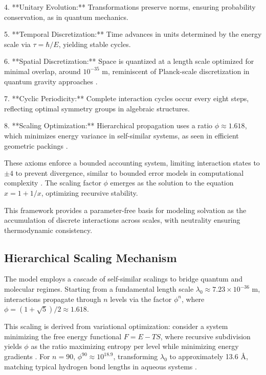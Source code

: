 \documentclass[twocolumn,prd,amsmath,amssymb,aps,superscriptaddress,nofootinbib]{revtex4-2}
\begin{document}
4. **Unitary Evolution:** Transformations preserve norms, ensuring probability conservation, as in quantum mechanics.

5. **Temporal Discretization:** Time advances in units determined by the energy scale via $\tau = \hbar / E$, yielding stable cycles.

6. **Spatial Discretization:** Space is quantized at a length scale optimized for minimal overlap, around $10^{-35}$ m, reminiscent of Planck-scale discretization in quantum gravity approaches \cite{Rovelli1998}.

7. **Cyclic Periodicity:** Complete interaction cycles occur every eight steps, reflecting optimal symmetry groups in algebraic structures.

8. **Scaling Optimization:** Hierarchical propagation uses a ratio $\phi \approx 1.618$, which minimizes energy variance in self-similar systems, as seen in efficient geometric packings \cite{Hales2005}.

These axioms enforce a bounded accounting system, limiting interaction states to $\pm 4$ to prevent divergence, similar to bounded error models in computational complexity \cite{Arora2009}. The scaling factor $\phi$ emerges as the solution to the equation $x = 1 + 1/x$, optimizing recursive stability.

This framework provides a parameter-free basis for modeling solvation as the accumulation of discrete interactions across scales, with neutrality ensuring thermodynamic consistency.

\subsection{Hierarchical Scaling Mechanism}

The model employs a cascade of self-similar scalings to bridge quantum and molecular regimes. Starting from a fundamental length scale $\lambda_0 \approx 7.23 \times 10^{-36}$ m, interactions propagate through $n$ levels via the factor $\phi^n$, where $\phi = (1 + \sqrt{5})/2 \approx 1.618$.

This scaling is derived from variational optimization: consider a system minimizing the free energy functional $F = E - TS$, where recursive subdivision yields $\phi$ as the ratio maximizing entropy per level while minimizing energy gradients \cite{Tkatchenko2012}. For $n=90$, $\phi^{90} \approx 10^{18.9}$, transforming $\lambda_0$ to approximately 13.6 \AA, matching typical hydrogen bond lengths in aqueous systems \cite{Steiner2002}.
\end{document}
